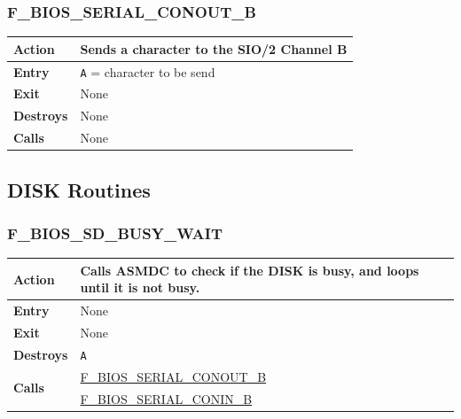 \documentclass[a4paper,11pt]{article}
\begin{document}
        \subsubsection{F\_BIOS\_SERIAL\_CONOUT\_B}
        \label{func:fbiosserialconoutb}
        \begin{tabular}{l p{9cm}}
            \hline\textbf{Action}
            & Sends a character to the \textbf{SIO/2} Channel B \\
            \hline\textbf{Entry} & \texttt{A} = character to be send \\
            \hline\textbf{Exit} & None \\
            \hline\textbf{Destroys} & None \\
            \hline\textbf{Calls} & None \\
            \hline
        \end{tabular}

    \subsection{DISK Routines}

        \subsubsection{F\_BIOS\_SD\_BUSY\_WAIT}
        \label{func:fbiossdbusywait}
        \begin{tabular}{l p{9cm}}
            \hline\textbf{Action}
            & Calls \textbf{ASMDC} to check if the \textbf{DISK} is busy, and
            loops until it is not busy. \\
            \hline\textbf{Entry} & None \\
            \hline\textbf{Exit} & None \\
            \hline\textbf{Destroys} & \texttt{A} \\
            \hline\multirow[t]{2}{4em}{\textbf{Calls}}
            & \hyperref[func:fbiosserialconoutb]{F\_BIOS\_SERIAL\_CONOUT\_B}\\
            & \hyperref[func:fbiosserialconinb]{F\_BIOS\_SERIAL\_CONIN\_B}\\
            \hline
        \end{tabular}
\end{document}

